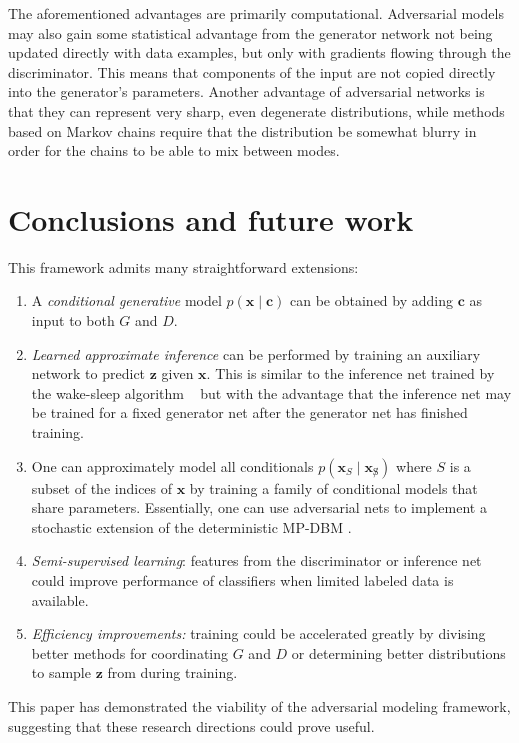 \documentclass{article}
\begin{document}
The aforementioned advantages are primarily computational. Adversarial models may
also gain some statistical advantage from the generator network not being updated
directly with data examples, but only with gradients flowing through the discriminator.
This means that components of the input are not copied directly into the generator's
parameters. Another advantage of adversarial networks is that they can represent
very sharp, even degenerate distributions, while methods based on Markov chains require
that the distribution be somewhat blurry in order for the chains to be able to mix
between modes.

\section{Conclusions and future work}

This framework
admits many straightforward extensions:
\begin{enumerate}[noitemsep,leftmargin=0.4cm]
\item A {\em conditional generative} model $p(\bm{x} \mid \bm{c})$ can be obtained by adding $\bm{c}$
as input to both $G$ and $D$.
\item {\em Learned approximate inference} can be performed by training an auxiliary network to predict
    $\bm{z}$ given $\bm{x}$. This is similar to the inference net trained by the wake-sleep algorithm ~\citep{Hinton95}
but with the advantage that the inference net may be trained for a fixed generator net after the generator
net has finished training.
\item One can approximately model all conditionals $p(\bm{x}_S \mid \bm{x}_{\not S})$ where $S$ is a subset of
the indices of $\bm{x}$
by training a family of conditional models that share parameters. Essentially, one can use adversarial nets to implement
 a stochastic extension of the deterministic MP-DBM \cite{Goodfellow-et-al-NIPS2013-small}.
\item {\em Semi-supervised learning}: features from the discriminator or inference net could improve performance
of classifiers when limited labeled data is available.
\item {\em Efficiency improvements:} training could be accelerated greatly by divising better methods for
coordinating $G$ and $D$ or determining better distributions to sample $\mathbf{z}$ from during training.
\end{enumerate}
This paper has demonstrated the viability of the adversarial modeling framework, suggesting that these research
directions could prove useful.
\end{document}

